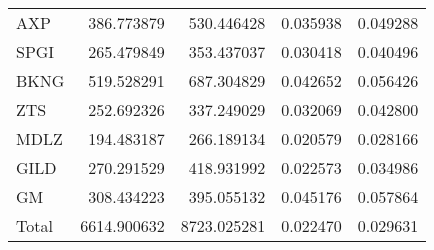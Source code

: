 \documentclass{gji}
\begin{document}
{\begin{tabular}{@{}lrrrr}
AXP & 386.773879 & 530.446428 & 0.035938 & 0.049288 \\
SPGI & 265.479849 & 353.437037 & 0.030418 & 0.040496 \\
BKNG & 519.528291 & 687.304829 & 0.042652 & 0.056426 \\
ZTS & 252.692326 & 337.249029 & 0.032069 & 0.042800 \\
MDLZ & 194.483187 & 266.189134 & 0.020579 & 0.028166 \\
GILD & 270.291529 & 418.931992 & 0.022573 & 0.034986 \\
GM & 308.434223 & 395.055132 & 0.045176 & 0.057864 \\
Total & 6614.900632 & 8723.025281 & 0.022470 & 0.029631 \\
\hline
\end{tabular}}
\end{document}

